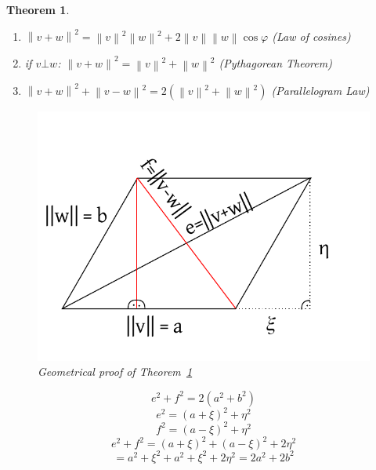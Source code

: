 \documentclass{article}
\newtheorem{theorem}{Theorem}  \numberwithin{theorem}{section}
\newcommand{\norm}[1]{\left\|#1\right\|}
\begin{document}
\begin{theorem} %
  \label{thm834}
  \begin{enumerate}
    \item $\norm{v + w}^2 = \norm{v}^2 \norm{w}^2 + 2 \norm v \norm w \cos{\varphi}$ (Law of cosines)
    \item if $v \bot w$: $\norm {v + w}^2 = \norm{v}^2 + \norm{w}^2$ (Pythagorean Theorem)
    \item $\norm{v + w}^2 + \norm{v - w}^2 = 2 (\norm{v}^2 + \norm{w}^2)$ (Parallelogram Law)
  \end{enumerate}

  \begin{figure}[!h]
    \begin{center}
      \includegraphics{img/06_geometrical_proof.pdf}
      \caption{Geometrical proof of Theorem~\ref{thm834}}
    \end{center}
  \end{figure}

  \[ e^2 + f^2 = 2 (a^2 + b^2) \]
  \[ e^2 = (a + \xi)^2 + \eta^2 \]
  \[ f^2 = (a - \xi)^2 + \eta^2 \]
  \[ e^2 + f^2 = (a + \xi)^2 + (a - \xi)^2 + 2\eta^2 \]
  \[ = a^2 + \xi^2 + a^2 + \xi^2 + 2\eta^2 = 2a^2 + 2b^2 \]
\end{theorem}
\end{document}
